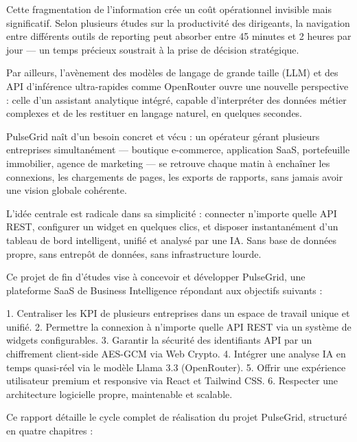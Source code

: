 ﻿\documentclass[12pt,a4paper,oneside]{report} %
\begin{document}
Cette fragmentation de l'information crée un coût opérationnel invisible mais significatif. Selon plusieurs études sur la productivité des dirigeants, la navigation entre différents outils de reporting peut absorber entre 45 minutes et 2 heures par jour — un temps précieux soustrait à la prise de décision stratégique.

Par ailleurs, l'avènement des modèles de langage de grande taille (LLM) et des API d'inférence ultra-rapides comme OpenRouter ouvre une nouvelle perspective : celle d'un assistant analytique intégré, capable d'interpréter des données métier complexes et de les restituer en langage naturel, en quelques secondes.

PulseGrid naît d'un besoin concret et vécu : un opérateur gérant plusieurs entreprises simultanément — boutique e-commerce, application SaaS, portefeuille immobilier, agence de marketing — se retrouve chaque matin à enchaîner les connexions, les chargements de pages, les exports de rapports, sans jamais avoir une vision globale cohérente.

L'idée centrale est radicale dans sa simplicité : connecter n'importe quelle API REST, configurer un widget en quelques clics, et disposer instantanément d'un tableau de bord intelligent, unifié et analysé par une IA. Sans base de données propre, sans entrepôt de données, sans infrastructure lourde.

Ce projet de fin d'études vise à concevoir et développer PulseGrid, une plateforme SaaS de Business Intelligence répondant aux objectifs suivants :

1. Centraliser les KPI de plusieurs entreprises dans un espace de travail unique et unifié.
2. Permettre la connexion à n'importe quelle API REST via un système de widgets configurables.
3. Garantir la sécurité des identifiants API par un chiffrement client-side AES-GCM via Web Crypto.
4. Intégrer une analyse IA en temps quasi-réel via le modèle Llama 3.3 (OpenRouter).
5. Offrir une expérience utilisateur premium et responsive via React et Tailwind CSS.
6. Respecter une architecture logicielle propre, maintenable et scalable.

Ce rapport détaille le cycle complet de réalisation du projet PulseGrid, structuré en quatre chapitres :
\end{document}
